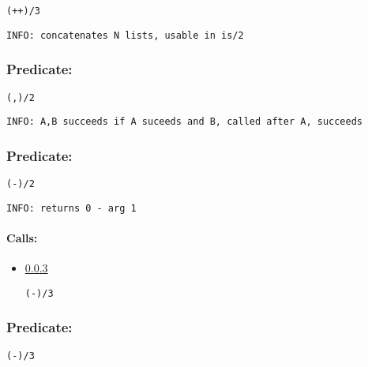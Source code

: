 \begin{verbatim}
(++)/3
\end{verbatim}

{\small \begin{verbatim}
INFO: concatenates N lists, usable in is/2

\end{verbatim}}

\subsubsection{Predicate:} \label{V44WV95W2}

\begin{verbatim}
(,)/2
\end{verbatim}

{\small \begin{verbatim}
INFO: A,B succeeds if A suceeds and B, called after A, succeeds

\end{verbatim}}

\subsubsection{Predicate:} \label{V45WV95W2}

\begin{verbatim}
(-)/2
\end{verbatim}

{\small \begin{verbatim}
INFO: returns 0 - arg 1

\end{verbatim}}
\paragraph{Calls:} 
\begin{itemize}
\item \ref{V45WV95W3} 
\begin{verbatim}
(-)/3
\end{verbatim}

\end{itemize}

\subsubsection{Predicate:} \label{V45WV95W3}

\begin{verbatim}
(-)/3
\end{verbatim}

